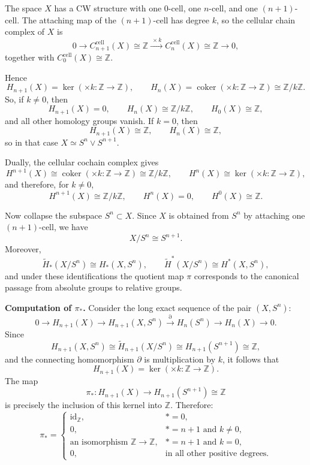 \begin{solution}
The space \(X\) has a CW structure with one \(0\)-cell, one \(n\)-cell, and one \((n+1)\)-cell. The attaching map of the \((n+1)\)-cell has degree \(k\), so the cellular chain complex of \(X\) is
\[
0\longrightarrow C_{n+1}^{\mathrm{cell}}(X)\cong \mathbb Z
\xrightarrow{\ \times k\ }
C_n^{\mathrm{cell}}(X)\cong \mathbb Z
\longrightarrow 0,
\]
together with \(C_0^{\mathrm{cell}}(X)\cong \mathbb Z\).

Hence
\[
H_{n+1}(X)=\ker(\times k:\mathbb Z\to\mathbb Z),
\qquad
H_n(X)=\operatorname{coker}(\times k:\mathbb Z\to\mathbb Z)\cong \mathbb Z/k\mathbb Z.
\]
So, if \(k\neq 0\), then
\[
H_{n+1}(X)=0,
\qquad
H_n(X)\cong \mathbb Z/k\mathbb Z,
\qquad
H_0(X)\cong \mathbb Z,
\]
and all other homology groups vanish. If \(k=0\), then
\[
H_{n+1}(X)\cong \mathbb Z,
\qquad
H_n(X)\cong \mathbb Z,
\]
so in that case \(X\simeq S^n\vee S^{n+1}\).

Dually, the cellular cochain complex gives
\[
H^{n+1}(X)\cong \operatorname{coker}(\times k:\mathbb Z\to\mathbb Z)\cong \mathbb Z/k\mathbb Z,
\qquad
H^n(X)\cong \ker(\times k:\mathbb Z\to\mathbb Z),
\]
and therefore, for \(k\neq 0\),
\[
H^{n+1}(X)\cong \mathbb Z/k\mathbb Z,
\qquad
H^n(X)=0,
\qquad
H^0(X)\cong \mathbb Z.
\]

Now collapse the subspace \(S^n\subset X\). Since \(X\) is obtained from \(S^n\) by attaching one \((n+1)\)-cell, we have
\[
X/S^n\cong S^{n+1}.
\]
Moreover,
\[
\widetilde H_*(X/S^n)\cong H_*(X,S^n),
\qquad
\widetilde H^*(X/S^n)\cong H^*(X,S^n),
\]
and under these identifications the quotient map \(\pi\) corresponds to the canonical passage from absolute groups to relative groups.

\par

\textbf{Computation of \(\pi_*\).}
Consider the long exact sequence of the pair \((X,S^n)\):
\[
0\to H_{n+1}(X)\to H_{n+1}(X,S^n)\xrightarrow{\partial} H_n(S^n)\to H_n(X)\to 0.
\]
Since
\[
H_{n+1}(X,S^n)\cong \widetilde H_{n+1}(X/S^n)\cong H_{n+1}(S^{n+1})\cong \mathbb Z,
\]
and the connecting homomorphism \(\partial\) is multiplication by \(k\), it follows that
\[
H_{n+1}(X)=\ker(\times k:\mathbb Z\to\mathbb Z).
\]
The map
\[
\pi_*:H_{n+1}(X)\to H_{n+1}(S^{n+1})\cong \mathbb Z
\]
is precisely the inclusion of this kernel into \(\mathbb Z\). Therefore:
\[
\pi_*=
\begin{cases}
	\mathrm{id}_{\mathbb Z}, & *=0,\\[1mm]
	0, & *=n+1 \text{ and } k\neq 0,\\[1mm]
	\text{an isomorphism }\mathbb Z\to\mathbb Z, & *=n+1 \text{ and } k=0,\\[1mm]
	0, & \text{in all other positive degrees.}
\end{cases}
\]


\end{solution}

